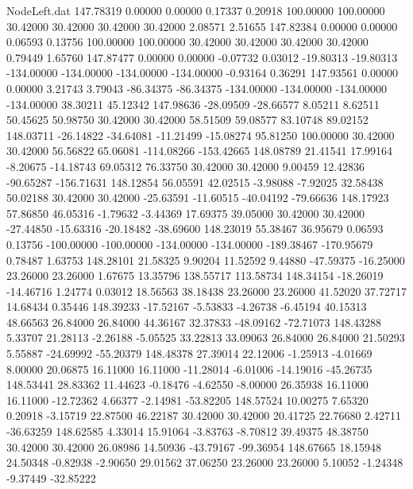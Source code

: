 \begin{filecontents}{NodeLeft.dat}
 147.78319    0.00000    0.00000     0.17337    0.20918  100.00000  100.00000   30.42000   30.42000   30.42000   30.42000    2.08571    2.51655
 147.82384    0.00000    0.00000     0.06593    0.13756  100.00000  100.00000   30.42000   30.42000   30.42000   30.42000    0.79449    1.65760
 147.87477    0.00000    0.00000    -0.07732    0.03012  -19.80313  -19.80313 -134.00000 -134.00000 -134.00000 -134.00000   -0.93164    0.36291
 147.93561    0.00000    0.00000     3.21743    3.79043  -86.34375  -86.34375 -134.00000 -134.00000 -134.00000 -134.00000   38.30211   45.12342
 147.98636  -28.09509  -28.66577     8.05211    8.62511   50.45625   50.98750   30.42000   30.42000   58.51509   59.08577   83.10748   89.02152
 148.03711  -26.14822  -34.64081   -11.21499  -15.08274   95.81250  100.00000   30.42000   30.42000   56.56822   65.06081 -114.08266 -153.42665
 148.08789   21.41541   17.99164    -8.20675  -14.18743   69.05312   76.33750   30.42000   30.42000    9.00459   12.42836  -90.65287 -156.71631
 148.12854   56.05591   42.02515    -3.98088   -7.92025   32.58438   50.02188   30.42000   30.42000  -25.63591  -11.60515  -40.04192  -79.66636
 148.17923   57.86850   46.05316    -1.79632   -3.44369   17.69375   39.05000   30.42000   30.42000  -27.44850  -15.63316  -20.18482  -38.69600
 148.23019   55.38467   36.95679     0.06593    0.13756 -100.00000 -100.00000 -134.00000 -134.00000 -189.38467 -170.95679    0.78487    1.63753
 148.28101   21.58325    9.90204    11.52592    9.44880  -47.59375  -16.25000   23.26000   23.26000    1.67675   13.35796  138.55717  113.58734
 148.34154  -18.26019  -14.46716     1.24774    0.03012   18.56563   38.18438   23.26000   23.26000   41.52020   37.72717   14.68434    0.35446
 148.39233  -17.52167   -5.53833    -4.26738   -6.45194   40.15313   48.66563   26.84000   26.84000   44.36167   32.37833  -48.09162  -72.71073
 148.43288    5.33707   21.28113    -2.26188   -5.05525   33.22813   33.09063   26.84000   26.84000   21.50293    5.55887  -24.69992  -55.20379
 148.48378   27.39014   22.12006    -1.25913   -4.01669    8.00000   20.06875   16.11000   16.11000  -11.28014   -6.01006  -14.19016  -45.26735
 148.53441   28.83362   11.44623    -0.18476   -4.62550   -8.00000   26.35938   16.11000   16.11000  -12.72362    4.66377   -2.14981  -53.82205
 148.57524   10.00275    7.65320     0.20918   -3.15719   22.87500   46.22187   30.42000   30.42000   20.41725   22.76680    2.42711  -36.63259
 148.62585    4.33014   15.91064    -3.83763   -8.70812   39.49375   48.38750   30.42000   30.42000   26.08986   14.50936  -43.79167  -99.36954
 148.67665   18.15948   24.50348    -0.82938   -2.90650   29.01562   37.06250   23.26000   23.26000    5.10052   -1.24348   -9.37449  -32.85222

\end{filecontents}
